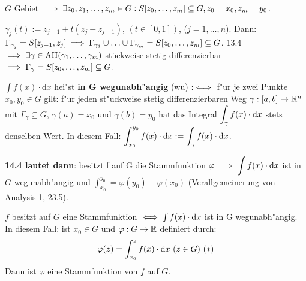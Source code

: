 \documentclass[a4paper,twoside,DIV15,BCOR12mm,chapterprefix=true,headings=twolinechapter]{scrbook}
\begin{document}
\begin{beweis}
$G$ Gebiet $\implies \exists z_0,z_1,\ldots,z_m \in G: S[z_0,\ldots,z_m]\subseteq G, z_0=x_0, z_m = y_0$.

$\gamma_j(t) := z_{j-1} + t(z_j - z_{j-1})$, $(t\in[0,1])$, ($j=1,\ldots,n$). Dann:$\Gamma_{\gamma_j} = S[z_{j-1},z_{j}] \implies \Gamma_{\gamma_1}\cup\ldots\cup\Gamma_{\gamma_m} = S[z_0,\ldots,z_m] \subseteq G$. 13.4 $\implies \exists \gamma \in \text{AH}(\gamma_1,\ldots,\gamma_m)$ stückweise stetig differenzierbar $\implies \Gamma_{\gamma} = S[z_0,\ldots,z_m] \subseteq G$. 
\end{beweis}

\begin{definition*}
$\int f(x)\cdot \text{d}x$ hei"st \textbf{in G wegunabh"angig} (wu) $:\iff$ f"ur je zwei Punkte $x_0, y_0\in G$ gilt: f"ur jeden st"uckweise stetig differenzierbaren Weg $\gamma:[a,b]\to\mathbb{R}^n$ mit $\Gamma_\gamma\subseteq G$, $\gamma(a)=x_0$ und $\gamma(b)=y_0$ hat das Integral $\displaystyle\int_\gamma f(x)\cdot\text{d}x$ stets denselben Wert. In diesem Fall: $\displaystyle\int_{x_0}^{y_0}f(x)\cdot\text{d}x:=\displaystyle\int_\gamma f(x)\cdot\text{d}x$.
\end{definition*}

\textbf{14.4 lautet dann}: besitzt f auf G die Stammfunktion $\varphi\implies \displaystyle\int f(x)\cdot\text{d}x$ ist in $G$ wegunabh"angig und $\int_{x_0}^{y_0}=\varphi(y_0)-\varphi(x_0)$ (Verallgemeinerung von Analysis 1, 23.5).

\begin{satz}
$f$ besitzt auf $G$ eine Stammfunktion $\iff\int f(x)\cdot\text{d}x$ ist in G wegunabh"angig. \\
In diesem Fall: ist $x_0\in G$ und $\varphi:G\to\mathbb{R}$ definiert durch: 
$$\varphi(z)=\displaystyle\int_{x_0}^z f(x)\cdot\text{d}x\ (z\in G)\ (*)$$Dann ist $\varphi$ eine Stammfunktion von $f$ auf $G$.
\end{satz}
\end{document}

